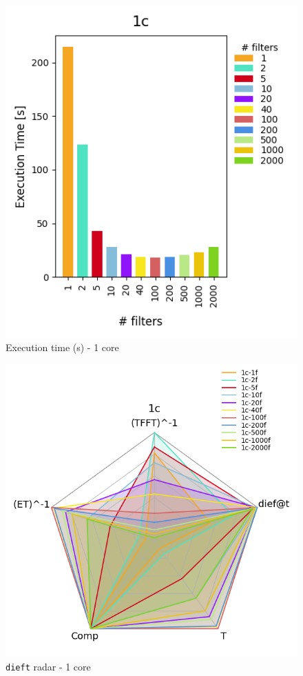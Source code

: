 \documentclass[12pt,a4paper]{article}
\begin{document}
\begin{figure}[H]
  \centering
  \includegraphics[scale = 0.5]{images/4-Experiments/E2/fixedcores/1c/execTime.png}
  \caption{Execution time (s) - 1 core}
\end{figure}

\begin{figure}[H]
  \centering
  \includegraphics[scale = 0.5]{images/4-Experiments/E2/fixedcores/1c/radar-dieft.png}
  \caption{\texttt{dieft} radar - 1 core}
\end{figure}
\end{document}
